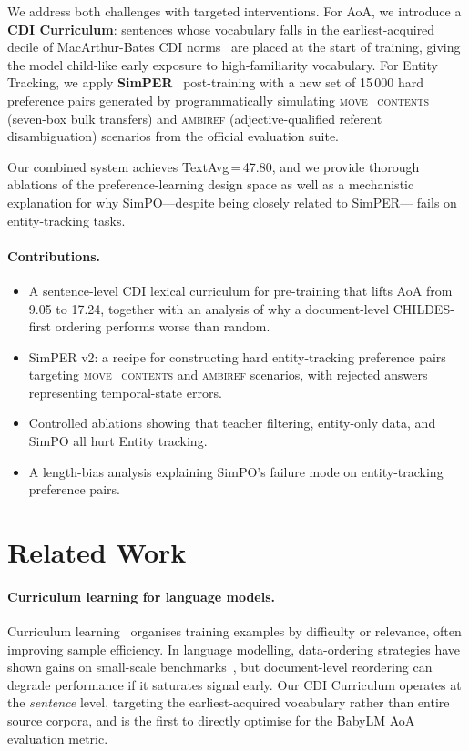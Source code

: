 \documentclass[11pt]{article}
\begin{document}
We address both challenges with targeted interventions.
For AoA, we introduce a \textbf{CDI Curriculum}: sentences
whose vocabulary falls in the earliest-acquired decile of
MacArthur-Bates CDI norms~\citep{fenson-etal-1994} are placed at the
start of training, giving the model child-like early exposure to
high-familiarity vocabulary.
For Entity Tracking, we apply \textbf{SimPER}~\citep{simper2025}
post-training with a new set of 15\,000 hard preference pairs
generated by programmatically simulating
\textsc{move\_contents} (seven-box bulk transfers)
and \textsc{ambiref} (adjective-qualified referent disambiguation)
scenarios from the official evaluation suite.

Our combined system achieves TextAvg\,=\,47.80,
and we provide thorough ablations of the preference-learning design
space as well as a mechanistic explanation for why
SimPO---despite being closely related to SimPER---
fails on entity-tracking tasks.

\paragraph{Contributions.}
\begin{itemize}
  \item A sentence-level CDI lexical curriculum for pre-training that
        lifts AoA from 9.05 to 17.24, together with an analysis of
        why a document-level CHILDES-first ordering performs worse
        than random.
  \item SimPER v2: a recipe for constructing hard entity-tracking
        preference pairs targeting \textsc{move\_contents} and
        \textsc{ambiref} scenarios,
        with rejected answers representing temporal-state errors.
  \item Controlled ablations showing that teacher filtering,
        entity-only data, and SimPO all hurt Entity tracking.
  \item A length-bias analysis explaining SimPO's failure mode
        on entity-tracking preference pairs.
\end{itemize}

\section{Related Work}

\paragraph{Curriculum learning for language models.}
Curriculum learning~\citep{bengio2009curriculum} organises training
examples by difficulty or relevance, often improving sample efficiency.
In language modelling, data-ordering strategies have shown gains
on small-scale benchmarks~\citep{hu-etal-2024-findings}, but
document-level reordering can degrade performance if it saturates
signal early.
Our CDI Curriculum operates at the \emph{sentence} level,
targeting the earliest-acquired vocabulary rather than entire
source corpora, and is the first to directly optimise
for the BabyLM AoA evaluation metric.
\end{document}
